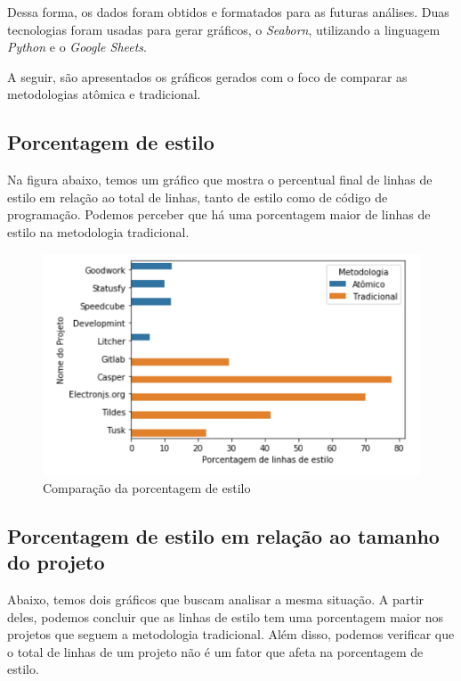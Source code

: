 Dessa forma, os dados foram obtidos e formatados para as futuras análises. Duas tecnologias foram usadas para gerar gráficos, o \emph{Seaborn}, utilizando a linguagem \emph{Python} e o \emph{Google Sheets}.

A seguir, são apresentados os gráficos gerados com o foco de comparar as metodologias atômica e tradicional.

\hypertarget{porcentagem de estilo}{%
\subsection{Porcentagem de estilo}\label{parcel}}

Na figura abaixo, temos um gráfico que mostra o percentual final de linhas de estilo em relação ao total de linhas, tanto de estilo como de código de programação. Podemos perceber que há uma porcentagem maior de linhas de estilo na metodologia tradicional. 

\begin{figure}[H]
\centering
\includegraphics{figuras/barra-linha-estilo.png}
\caption{Comparação da porcentagem de estilo}
\end{figure}

\newpage

\hypertarget{porcentagem de estilo}{%
\subsection{Porcentagem de estilo em relação ao tamanho do projeto}\label{parcel}}

Abaixo, temos dois gráficos que buscam analisar a mesma situação. A partir deles, podemos concluir que as linhas de estilo tem uma porcentagem maior nos projetos que seguem a metodologia tradicional. Além disso, podemos verificar que o total de linhas de um projeto não é um fator que afeta na porcentagem de estilo.

